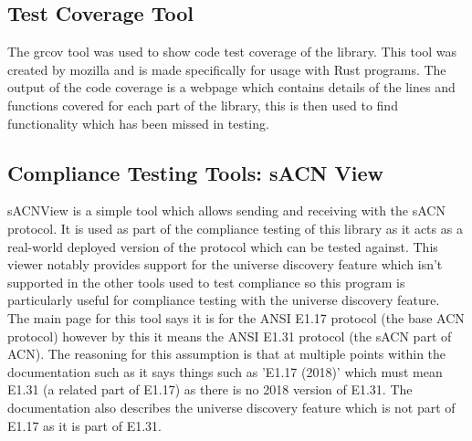 \documentclass[11pt,a4paper]{article}
\begin{document}
\subsection{Test Coverage Tool}
The grcov \cite{GRCOV} tool was used to show code test coverage of the library. This tool was created by mozilla and is made specifically for usage with Rust programs. The output of the code coverage is a webpage which contains details of the lines and functions covered for each part of the library, this is then used to find functionality which has been missed in testing. 

\subsection{Compliance Testing Tools: sACN View}
sACNView \cite{SACN_VIEW} is a simple tool which allows sending and receiving with the sACN protocol. It is used as part of the compliance testing of this library as it acts as a real-world deployed version of the protocol which can be tested against. This viewer notably provides support for the universe discovery feature which isn't supported in the other tools used to test compliance so this program is particularly useful for compliance testing with the universe discovery feature.\\

The main page for this tool says it is for the ANSI E1.17 \cite{ANSI_E1.17} protocol (the base ACN protocol) however by this it means the ANSI E1.31 protocol (the sACN part of ACN). The reasoning for this assumption is that at multiple points within the documentation such as \cite{SACN_VIEWER_DOC} it says things such as 'E1.17 (2018)' which must mean E1.31 (a related part of E1.17) as there is no 2018 version of E1.31. The documentation also describes the universe discovery feature which is not part of E1.17 as it is part of E1.31.
\end{document}
